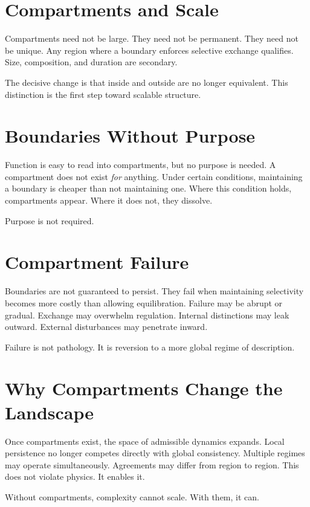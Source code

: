 \documentclass[11pt,twoside,openright]{book}
\begin{document}
\section*{Compartments and Scale}

Compartments need not be large. They need not be permanent. They need not be unique. Any region where a boundary enforces selective exchange qualifies. Size, composition, and duration are secondary.

The decisive change is that inside and outside are no longer equivalent. This distinction is the first step toward scalable structure.

\section*{Boundaries Without Purpose}

Function is easy to read into compartments, but no purpose is needed. A compartment does not exist \emph{for} anything. Under certain conditions, maintaining a boundary is cheaper than not maintaining one. Where this condition holds, compartments appear. Where it does not, they dissolve.

Purpose is not required.

\section*{Compartment Failure}

Boundaries are not guaranteed to persist. They fail when maintaining selectivity becomes more costly than allowing equilibration. Failure may be abrupt or gradual. Exchange may overwhelm regulation. Internal distinctions may leak outward. External disturbances may penetrate inward.

Failure is not pathology. It is reversion to a more global regime of description.

\section*{Why Compartments Change the Landscape}

Once compartments exist, the space of admissible dynamics expands. Local persistence no longer competes directly with global consistency. Multiple regimes may operate simultaneously. Agreements may differ from region to region. This does not violate physics. It enables it.

Without compartments, complexity cannot scale. With them, it can.
\end{document}
